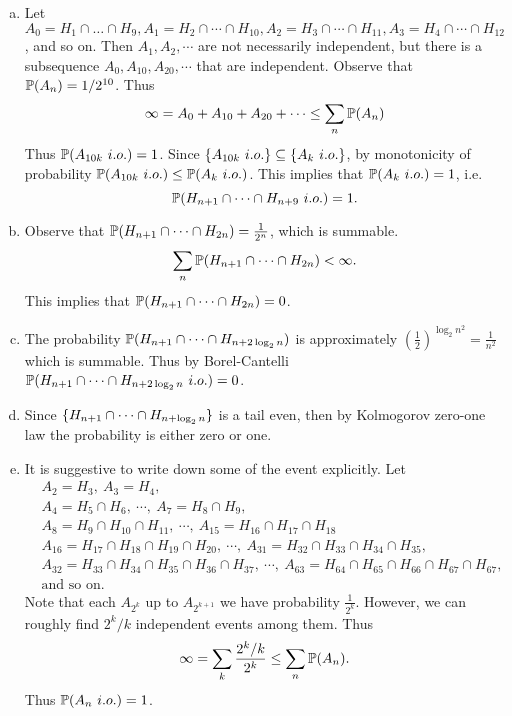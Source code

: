 \begin{solution}
	\begin{enumerate}[(a)]
		\item Let $ A_0 = H_1\cap\dots\cap H_{9}, A_1 = H_2\cap\cdots\cap H_{10}, A_2 = H_3\cap\cdots\cap H_{11}, A_3 = H_4\cap\cdots\cap H_{12} $, and so on. Then $ A_1,A_2,\cdots $ are not necessarily independent, but there is a subsequence $ A_0,A_{10},A_{20},\cdots $ that are independent. Observe that $ \mathbb{P}(A_n) = 1/2^{10} $. Thus 
		\[ \infty = A_0+A_{10}+A_{20}+\cdots \leq \sum_n \mathbb{P}(A_n)  \]
		 Thus $ \mathbb{P}(A_{10k}\ i.o.) = 1 $. Since $ \set{A_{10k}\ i.o.} \subseteq \set{A_{k}\ i.o.} $, by monotonicity of probability $ \mathbb{P}(A_{10k}\ i.o.)\leq\mathbb{P}(A_k\ i.o.) $. This implies that $ \mathbb{P}(A_k\ i.o.) = 1 $, i.e. \[ \mathbb{P}(H_{n+1}\cap\cdots\cap H_{n+9}\ i.o.) = 1. \]
		 \item Observe that $ \mathbb{P}(H_{n+1}\cap\cdots\cap H_{2n}) = \frac{1}{2^n} $, which is summable.
		 \[ \sum_n \mathbb{P}(H_{n+1}\cap\cdots\cap H_{2n}) < \infty. \] 
		 This implies that $ \mathbb{P}(H_{n+1}\cap\cdots\cap H_{2n}) = 0 $.
		 \item The probability $ \mathbb{P}(H_{n+1}\cap\dots\cap H_{n+2\log_2n}) $ is approximately $ (\frac{1}{2})^{\log_2n^2} = \frac{1}{n^2} $ which is summable. Thus by Borel-Cantelli $ \mathbb{P}(H_{n+1}\cap\cdots\cap H_{n+2\log_2n}\ i.o.) = 0 $.
		 
		 \item Since $ \{H_{n+1}\cap\cdots\cap H_{n+\log_2n}\} $ is a tail even, then by Kolmogorov zero-one law the probability is either zero or one.
		 
		 \item It is suggestive to write down some of the event explicitly. Let
		 \begin{align*}
		 	&A_2 = H_3,\ A_3=H_4,\\
		 	& A_4=H_5\cap H_6,\ \cdots ,\ A_7 = H_8\cap H_9,\\
		 	& A_8=H_9\cap H_{10}\cap H_{11},\ \cdots,\  A_{15}=H_{16}\cap H_{17}\cap H_{18} \\
		 	& A_{16}=H_{17}\cap H_{18}\cap H_{19}\cap H_{20},\ \cdots,\  A_{31} = H_{32}\cap H_{33}\cap H_{34} \cap H_{35},\\
		 	&A_{32}=H_{33}\cap H_{34}\cap H_{35}\cap H_{36}\cap H_{37},\ \cdots,\ A_{63}=H_{64}\cap H_{65}\cap H_{66}\cap H_{67}\cap H_{67}, \\
		 	&\text{and so on.}
		 \end{align*}
		 Note that each $ A_{2^k} $ up to $ A_{2^{k+1}} $ we have probability $ \frac{1}{2^k} $. However, we can roughly find $ 2^k/k $ independent events among them. 
		 Thus 
		 \[ \infty = \sum_k \frac{2^k/k}{2^k} \leq \sum_n \mathbb{P}(A_n). \]
		 Thus $ \mathbb{P}(A_n\ i.o.) = 1 $.
	\end{enumerate}
\end{solution}


